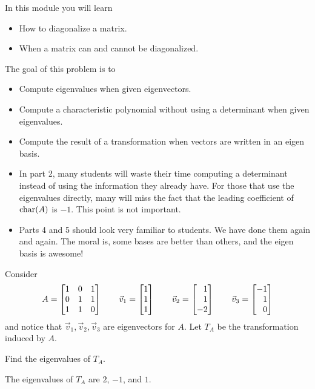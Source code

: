 \documentclass{workbook}
\newcommand{\bookonlynewpage}{\begin{bookonly}\newpage\end{bookonly}}
\begin{document}
\begin{module}

	In this module you will learn
	\begin{itemize}
		\item How to diagonalize a matrix.
		\item When a matrix can and cannot be diagonalized.
	\end{itemize}

	
	
\end{module}
\begin{slide}
	\bookonlynewpage
	\question
	\label{actingOnEigenvectors}
	\begin{annotation}
		\begin{goals}

			The goal of this problem is to
			\begin{itemize}
				\item Compute eigenvalues when given eigenvectors.
				\item Compute a characteristic polynomial without using a determinant
					when given eigenvalues.
				\item Compute the result of a transformation when vectors are written in an eigen basis.
			\end{itemize}
		\end{goals}

		\begin{notes}
			\begin{itemize}
				\item In part 2, many students will waste their time computing a determinant instead
					of using the information they already have. For those that use the eigenvalues
					directly, many will miss the fact that the leading coefficient of $\operatorname{char}(A)$ is $-1$.
					This point is not important.
				\item Parts 4 and 5 should look very familiar to students. We have done them again and again.
					The moral is, some bases are better than others, and the eigen basis is awesome!
			\end{itemize}
		\end{notes}
	\end{annotation}
	Consider
	\[
		A=\mat{1&0&1\\0&1&1\\1&1&0}\qquad
		\vec v_1=\mat{1\\1\\1}\qquad
		\vec v_2=\mat{1\\1\\-2}\qquad
		\vec v_3=\mat{-1\\1\\0}
	\]
	and notice that $\vec v_1,\vec v_2,\vec v_3$ are eigenvectors for $A$. Let $T_A$ be the transformation induced by $A$.
	\begin{parts}
		\item Find the eigenvalues of $T_A$.
			\begin{solution}
				The eigenvalues of $T_A$ are $2$, $-1$, and $1$.


\end{solution}
\end{parts}
\end{slide}
\end{document}
